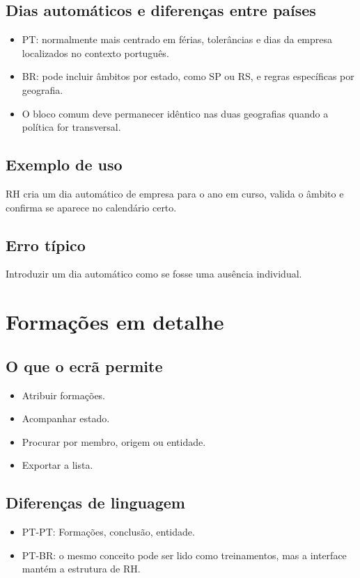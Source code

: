 \subsection{Dias automáticos e diferenças entre países}
\begin{itemize}
  \item PT: normalmente mais centrado em férias, tolerâncias e dias da empresa localizados no contexto português.
  \item BR: pode incluir âmbitos por estado, como SP ou RS, e regras específicas por geografia.
  \item O bloco comum deve permanecer idêntico nas duas geografias quando a política for transversal.
\end{itemize}

\subsection{Exemplo de uso}
RH cria um dia automático de empresa para o ano em curso, valida o âmbito e confirma se aparece no calendário certo.

\subsection{Erro típico}
Introduzir um dia automático como se fosse uma ausência individual.

\section{Formações em detalhe}
\subsection{O que o ecrã permite}
\begin{itemize}
  \item Atribuir formações.
  \item Acompanhar estado.
  \item Procurar por membro, origem ou entidade.
  \item Exportar a lista.
\end{itemize}

\subsection{Diferenças de linguagem}
\begin{itemize}
  \item PT-PT: Formações, conclusão, entidade.
  \item PT-BR: o mesmo conceito pode ser lido como treinamentos, mas a interface mantém a estrutura de RH.
\end{itemize}

